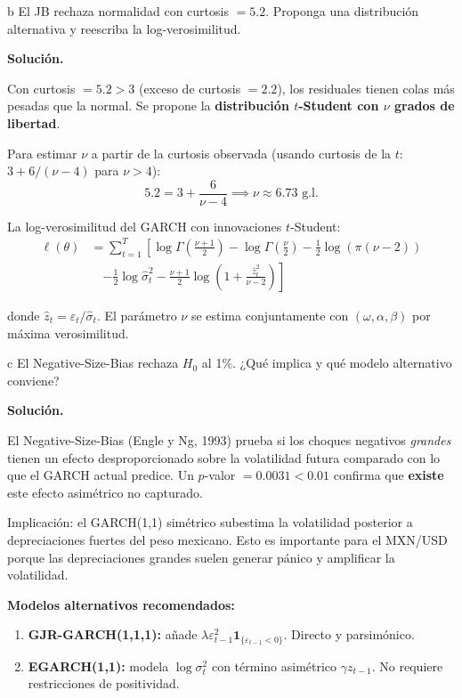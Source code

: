 \documentclass[11pt,a4paper]{article}
\newcommand{\sigmat}{\sigma^2_t}
\newcommand{\eps}{\varepsilon}
\begin{document}
\begin{cajaInciso}{b}
El JB rechaza normalidad con curtosis $=5.2$. Proponga una distribución alternativa y reescriba la log-verosimilitud.
\end{cajaInciso}

\textbf{Solución.}

Con curtosis $=5.2>3$ (exceso de curtosis $=2.2$), los residuales tienen colas más pesadas que la normal. Se propone la \textbf{distribución $t$-Student con $\nu$ grados de libertad}.

Para estimar $\nu$ a partir de la curtosis observada (usando curtosis de la $t$: $3+6/(\nu-4)$ para $\nu>4$):
\[
5.2 = 3 + \frac{6}{\nu-4} \implies \nu \approx 6.73 \text{ g.l.}
\]

La log-verosimilitud del GARCH con innovaciones $t$-Student:
\begin{align*}
\ell(\theta) &= \sum_{t=1}^{T} \left[ \log\Gamma\!\left(\frac{\nu+1}{2}\right) - \log\Gamma\!\left(\frac{\nu}{2}\right) - \frac{1}{2}\log(\pi(\nu-2)) \right. \\
&\quad \left. - \frac{1}{2}\log\hat{\sigma}_t^2 - \frac{\nu+1}{2}\log\!\left(1 + \frac{\hat{z}_t^2}{\nu-2}\right) \right]
\end{align*}

donde $\hat{z}_t = \hat{\eps}_t/\hat{\sigma}_t$. El parámetro $\nu$ se estima conjuntamente con $(\omega,\alpha,\beta)$ por máxima verosimilitud.

\begin{cajaInciso}{c}
El Negative-Size-Bias rechaza $H_0$ al 1\%. ¿Qué implica y qué modelo alternativo conviene?
\end{cajaInciso}

\textbf{Solución.}

El Negative-Size-Bias (Engle y Ng, 1993) prueba si los choques negativos \emph{grandes} tienen un efecto desproporcionado sobre la volatilidad futura comparado con lo que el GARCH actual predice. Un $p$-valor $=0.0031<0.01$ confirma que \textbf{existe} este efecto asimétrico no capturado.

Implicación: el GARCH(1,1) simétrico subestima la volatilidad posterior a depreciaciones fuertes del peso mexicano. Esto es importante para el MXN/USD porque las depreciaciones grandes suelen generar pánico y amplificar la volatilidad.

\textbf{Modelos alternativos recomendados:}
\begin{enumerate}[leftmargin=*]
  \item \textbf{GJR-GARCH(1,1,1):} añade $\lambda\eps_{t-1}^2\mathbf{1}_{\{\eps_{t-1}<0\}}$. Directo y parsimónico.
  \item \textbf{EGARCH(1,1):} modela $\log\sigmat$ con término asimétrico $\gamma z_{t-1}$. No requiere restricciones de positividad.
\end{enumerate}
\end{document}
